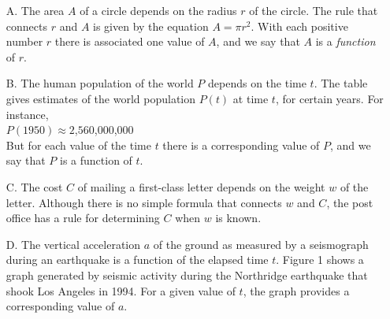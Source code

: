\documentclass{sebase}
\begin{document}
\begin{enumerate}
\item[A.] The area $A$ of a circle depends on the radius $r$ of the circle.
The rule that connects $r$ and $A$ is given by the equation $A=\pi r^{2}$.
With each positive number $r$ there is associated one value of $A$, and we
say that $A$ is a \textit{function} of $r$.%

\item[B.] The human population of the world $P$ depends on the time $t$. The
table gives estimates of the world population $P(t)$ at time $t$, for
certain years. For instance,\\[6pt]
\hspace*{\fill}$P(1950)\approx 2$,$560$,$000$,$000$\hspace*{\fill}\\[6pt]
But for each value of the time $t$ there is a corresponding value of $P$,
and we say that $P$ is a function of $t$.

\item[C.] The cost $C$ of mailing a first-class letter depends on the weight 
$w$ of the letter. Although there is no simple formula that connects $w$ and 
$C$, the post office has a rule for determining $C$ when $w$ is known.

\item[D.] The vertical acceleration $a$ of the ground as measured by a
seismograph during an earthquake is a function of the elapsed time $t$.
Figure 1 shows a graph generated by seismic activity during the Northridge
earthquake that shook Los Angeles in 1994. For a given value of $t$, the
graph provides a corresponding value of $a$.
\end{enumerate}
\end{document}
